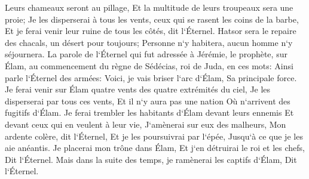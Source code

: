 \verse Leurs chameaux seront au pillage, Et la multitude de leurs troupeaux sera une proie; Je les disperserai à tous les vents, ceux qui se rasent les coins de la barbe, Et je ferai venir leur ruine de tous les côtés, dit l`Éternel. 
\verse Hatsor sera le repaire des chacals, un désert pour toujours; Personne n`y habitera, aucun homme n`y séjournera. 
\verse La parole de l`Éternel qui fut adressée à Jérémie, le prophète, sur Élam, au commencement du règne de Sédécias, roi de Juda, en ces mots: 
\verse Ainsi parle l`Éternel des armées: Voici, je vais briser l`arc d`Élam, Sa principale force. 
\verse Je ferai venir sur Élam quatre vents des quatre extrémités du ciel, Je les disperserai par tous ces vents, Et il n`y aura pas une nation Où n`arrivent des fugitifs d`Élam. 
\verse Je ferai trembler les habitants d`Élam devant leurs ennemis Et devant ceux qui en veulent à leur vie, J`amènerai sur eux des malheurs, Mon ardente colère, dit l`Éternel, Et je les poursuivrai par l`épée, Jusqu`à ce que je les aie anéantis. 
\verse Je placerai mon trône dans Élam, Et j`en détruirai le roi et les chefs, Dit l`Éternel. 
\verse Mais dans la suite des temps, je ramènerai les captifs d`Élam, Dit l`Éternel. 

\chapter{}

